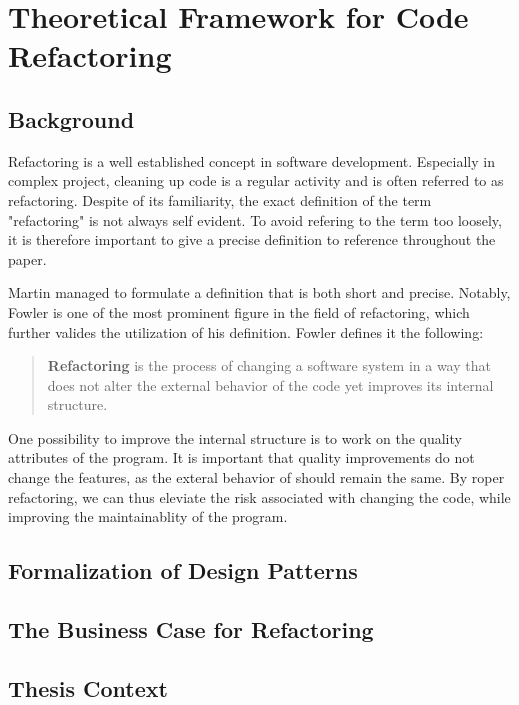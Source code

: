 \chapter{Theoretical Framework for Code Refactoring}

\section{Background}



Refactoring is a well established concept in software development. 
Especially in complex project, 
	cleaning up code is a regular activity and is often referred to as refactoring. 
Despite of its familiarity, 
	the exact definition of the term "refactoring" is not always self evident.
To avoid refering to the term too loosely, 
	it is therefore important to give a precise definition to reference throughout the paper. 

Martin \textcite{fowler2018} managed to formulate a definition that is both short and precise. 
Notably, Fowler is one of the most prominent figure in the field of refactoring,
	which further valides the utilization of his definition.
Fowler defines it the following:

\begin{quote}
\textbf{Refactoring} is the process of changing a software system in a way 
	that does not alter the external behavior of the code yet improves its internal structure.
\end{quote}

One possibility to improve the internal structure is to work on the quality attributes of the program. 
It is important that quality improvements do not change the features, 
	as the exteral behavior of should remain the same. 
By roper refactoring, we can thus eleviate the risk associated with changing the code,
	while improving the maintainablity of the program.






\section{Formalization of Design Patterns}
\section{The Business Case for Refactoring}
\section{Thesis Context}
